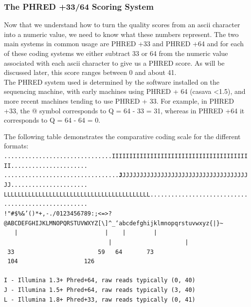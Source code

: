 \subsubsection{The PHRED +33/64 Scoring System}
\begin{information}
Now that we understand how to turn the quality scores from an ascii character into a numeric value, we need to know what these numbers represent.
The two main systems in common usage are PHRED +33 and PHRED +64 and for each of these coding systems we either subtract 33 or 64 from the numeric value associated with each ascii character to give us a PHRED score.
As will be discussed later, this score ranges between 0 and about 41.\\

The PHRED system used is determined by the software installed on the sequencing machine, with early machines using PHRED + 64 (casava \textless 1.5), and more recent machines tending to use PHRED + 33.
For example, in PHRED +33, the @ symbol corresponds to Q = 64 - 33 = 31, whereas in PHRED +64 it corresponds to Q = 64 - 64 = 0. \\
\end{information}

\begin{minipage}{\textwidth}

The following table demonstrates the comparative coding scale for the different formats: \\

\scriptsize
\texttt{...............................IIIIIIIIIIIIIIIIIIIIIIIIIIIIIIIIIIIIIIIII...................... \\
.................................\textbf{J}JJJJJJJJJJJJJJJJJJJJJJJJJJJJJJJJJJJJJJ...................... \\
LLLLLLLLLLLLLLLLLLLLLLLLLLLLLLLLLLLLLLLLLL.................................................... \\
!"\#\$\%\&'()*+,-./0123456789:;\textless =\textgreater?@ABCDEFGHIJKLMNOPQRSTUVWXYZ[\textbackslash]\^{}\_`abcdefghijklmnopqrstuvwxyz\{|\}\~{}} \\
\texttt{
~~|~~~~~~~~~~~~~~~~~~~~~~~~~|~~~~|~~~~~~~~|~~~~~~~~~~~~~~~~~~~~~~~~~~~~~~|~~~~~~~~~~~~~~~~~~~~~|~\\
~33~~~~~~~~~~~~~~~~~~~~~~~~59~~~64~~~~~~~73~~~~~~~~~~~~~~~~~~~~~~~~~~~~104~~~~~~~~~~~~~~~~~~~126~\\
~ \\
I - Illumina 1.3+ Phred+64,  raw reads typically (0, 40) \\ 
J - Illumina 1.5+ Phred+64,  raw reads typically (3, 40) \\
L - Illumina 1.8+ Phred+33,  raw reads typically (0, 41) \\
}
\end{minipage}

